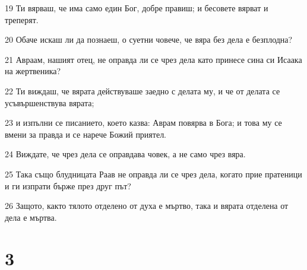 \par 19 Ти вярваш, че има само един Бог, добре правиш; и бесовете вярват и треперят.
\par 20 Обаче искаш ли да познаеш, о суетни човече, че вяра без дела е безплодна?
\par 21 Авраам, нашият отец, не оправда ли се чрез дела като принесе сина си Исаака на жертвеника?
\par 22 Ти виждаш, че вярата действуваше заедно с делата му, и че от делата се усъвършенствува вярата;
\par 23 и изпълни се писанието, което казва: Аврам повярва в Бога; и това му се вмени за правда и се нарече Божий приятел.
\par 24 Виждате, че чрез дела се оправдава човек, а не само чрез вяра.
\par 25 Така също блудницата Раав не оправда ли се чрез дела, когато прие пратеници и ги изпрати бърже през друг път?
\par 26 Защото, както тялото отделено от духа е мъртво, така и вярата отделена от дела е мъртва.

\chapter{3}

